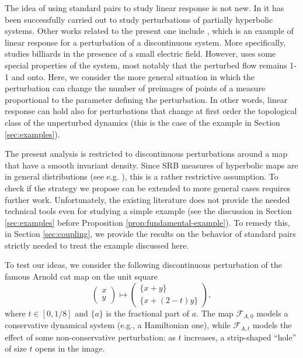 \documentclass{amsart}
\numberwithin{equation}{section}
\newcommand\cF{{\mathcal F}}
\newcommand{\catt}{\cF_{A,t}}
\newcommand{\cato}{\cF_{A,0}}
\begin{document}
The idea of using standard pairs to study linear response is not new. In \cite{Dolgopyat04} it has been successfully carried out to study perturbations of partially hyperbolic systems. Other works related to the present one include \cite{CELS93}, which is an example of linear response for a perturbation of a discontinuous system. More specifically, \cite{CELS93} studies billiards in the presence of a small electric field. However, \cite{CELS93} uses some special properties of the system, most notably that the perturbed flow remains 1-1 and onto. Here, we consider the more general situation in which the perturbation can change the number of preimages of points of a measure proportional to the parameter defining the perturbation. In other words, linear response can hold also for perturbations that change at first order the topological class of the unperturbed dynamics (this is the case of the example in Section \ref{sec:examples}).

The present analysis is restricted to discontinuous perturbations around a map that have a smooth invariant density. Since SRB measures of hyperbolic maps are in general distributions (see e.g. \cite{DKL21}), this is a rather restrictive assumption. To check if the strategy we propose can be extended to more general cases requires further work. Unfortunately, the existing literature does not provide the needed technical tools even for studying a simple example (see the discussion in Section \ref{sec:examples} before Proposition \ref{prop:fundamental-example}). To remedy this, in Section \ref{sec:coupling}, we provide the results on the behavior of standard pairs strictly needed to treat the example discussed here.

To test our ideas, we consider the following discontinuous perturbation of the famous Arnold cat map on the unit square
\[
    \begin{pmatrix}x\\y 
\end{pmatrix} \mapsto  \begin{pmatrix} \{x + y\}\\
\{x+(2-t)y\}\end{pmatrix},
\]
where \(t \in [0, 1/8]\) and \(\{a\}\) is the fractional part of \(a\). The map \(\cato\) models a conservative dynamical system (e.g., a Hamiltonian one), while \(\catt\) models the effect of some non-conservative perturbation: as \(t\) increases, a strip-shaped ``hole'' of size \(t\) opens in the image.

\end{document}
